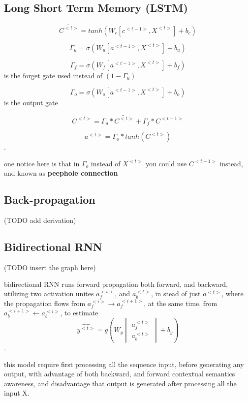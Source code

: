 \documentclass[4apaper,12pt]{book}
\begin{document}
\begin{description}
    \subsection{Long Short Term Memory (LSTM)}
    \begin{description}
    \item $$\tilde{C^{<t>}}=tanh(W_c[c^{<t-1>},X^{<t>}]+b_c) $$
    \item $$ \Gamma_u = \sigma(W_u[a^{<t-1>},X^{<t>}]+b_u) $$
    \item $$ \Gamma_f = \sigma(W_f[a^{<t-1>},X^{<t>}]+b_f) $$ is the forget gate used instead of $(1-\Gamma_u)$.
    \item $$ \Gamma_o = \sigma(W_o[a^{<t-1>},X^{<t>}]+b_o) $$ is the output gate
    \item $$ C^{<t>}=\Gamma_u * \tilde{C^{<t>}} + \Gamma_f*C^{<t-1>}$$
    \item $$ a^{<t>} = \Gamma_o * tanh(C^{<t>})$$.
    \item one notice here is that in $\Gamma_o$ instead of $X^{<t>}$ you could use $C^{<t-1>}$ instead, and known as \textbf{peephole connection}
      \subsection{Back-propagation}
      \begin{description}
        \item (TODO add derivation)
        \end{description}
    \end{description}
    \subsection{Bidirectional RNN}
    \begin{description}
    \item (TODO insert the graph here)
    \item bidirectional RNN runs forward propagation both forward, and backward, utilizing two activation unites $a_f^{<t>}$, and $a_b^{<t>}$, in stead of just $a^{<t>}$, where the propagation flows from $a_f^{<i>} \rightarrow a_f^{<i+1>}$, at the same time, from $a_b^{<i+1>} \leftarrow a_b^{<i>}$, to estimate $$\hat{y^{<t>}} = g(W_y\begin{vmatrix}a_f^{<t>}\\a_b^{<t>}\end{vmatrix} + b_y)$$.
    \item this model require first processing all the sequence input, before generating any output, with advantage of both backward, and forward contextual semantics awareness, and disadvantage that output is generated after processing all the input X.
    \end{description}

\end{description}
\end{document}
